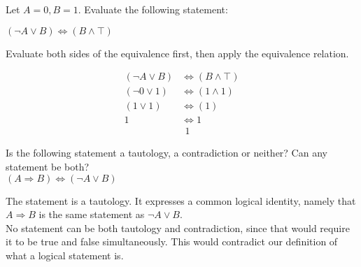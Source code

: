 \begin{problem}
  Let \(A=0, B=1\). Evaluate the following statement:\\
  \begin{center}
    \((\neg A \lor B) \Leftrightarrow (B \land \top)\)
  \end{center}

  \begin{hint}
    Evaluate both sides of the equivalence first, then apply the equivalence relation.
  \end{hint}

  \begin{sol}
    \begin{align*}
      (\neg A \lor B) &\Leftrightarrow (B \land \top)\\
      (\neg 0 \lor 1) &\Leftrightarrow (1 \land 1)\\
      (1 \lor 1) &\Leftrightarrow (1)\\
      1 &\Leftrightarrow 1\\
      &\ \, 1
    \end{align*}
  \end{sol}
\end{problem}

\begin{problem}
  Is the following statement a tautology, a contradiction or neither?
  Can any statement be both?\\
  \((A \Rightarrow B) \Leftrightarrow (\neg A \lor B)\)

  \begin{sol}
    The statement is a tautology. It expresses a common logical identity, namely
    that \(A \Rightarrow B\) is the same statement as \(\neg A \lor B\).\\
    No statement can be both tautology and contradiction, since that would
    require it to be true and false simultaneously. This would contradict our
    definition of what a logical statement is.
  \end{sol}
\end{problem}
